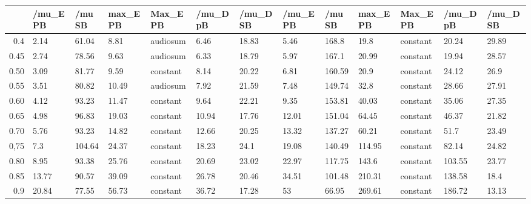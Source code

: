 \begin{table}[ht]
\centering
\begin{tabular}{rllllllllllll}
  \hline
 & /mu\_E PB & /mu SB & max\_E PB & Max\_E PB & /mu\_D pB & /mu\_D SB & /mu\_E PB & /mu SB & max\_E PB & Max\_E PB & /mu\_D pB & /mu\_D SB \\ 
  \hline
0.4 & 2.14 & 61.04 & 8.81 & audiosum & 6.46 & 18.83 & 5.46 & 168.8 & 19.8 & constant & 20.24 & 29.89 \\ 
  0.45 & 2.74 & 78.56 & 9.63 & audiosum & 6.33 & 18.79 & 5.97 & 167.1 & 20.99 & constant & 19.94 & 28.57 \\ 
  0.50 & 3.09 & 81.77 & 9.59 & constant & 8.14 & 20.22 & 6.81 & 160.59 & 20.9 & constant & 24.12 & 26.9 \\ 
  0.55 & 3.51 & 80.82 & 10.49 & audiosum & 7.92 & 21.59 & 7.48 & 149.74 & 32.8 & constant & 28.66 & 27.91 \\ 
  0.60 & 4.12 & 93.23 & 11.47 & constant & 9.64 & 22.21 & 9.35 & 153.81 & 40.03 & constant & 35.06 & 27.35 \\ 
  0.65 & 4.98 & 96.83 & 19.03 & constant & 10.94 & 17.76 & 12.01 & 151.04 & 64.45 & constant & 46.37 & 21.82 \\ 
  0.70 & 5.76 & 93.23 & 14.82 & constant & 12.66 & 20.25 & 13.32 & 137.27 & 60.21 & constant & 51.7 & 23.49 \\ 
  0,75 & 7.3 & 104.64 & 24.37 & constant & 18.23 & 24.1 & 19.08 & 140.49 & 114.95 & constant & 82.14 & 24.82 \\ 
  0.80 & 8.95 & 93.38 & 25.76 & constant & 20.69 & 23.02 & 22.97 & 117.75 & 143.6 & constant & 103.55 & 23.77 \\ 
  0.85 & 13.77 & 90.57 & 39.09 & constant & 26.78 & 20.46 & 34.51 & 101.48 & 210.31 & constant & 138.58 & 18.4 \\ 
  0.9 & 20.84 & 77.55 & 56.73 & constant & 36.72 & 17.28 & 53 & 66.95 & 269.61 & constant & 186.72 & 13.13 \\ 
   \hline
\end{tabular}
\end{table}

